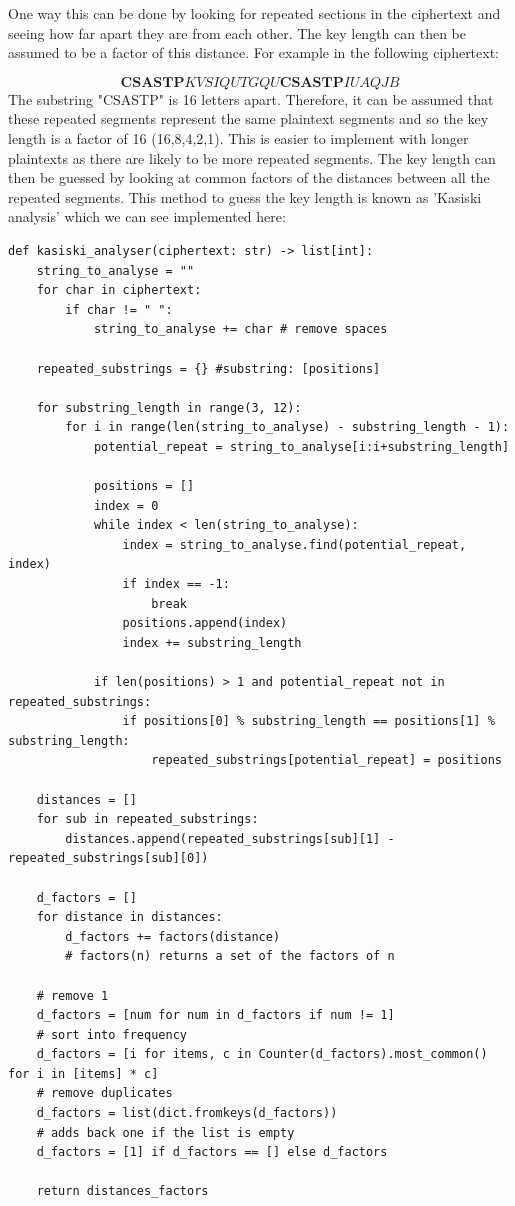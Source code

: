\documentclass{article}
\begin{document}
One way this can be done by looking for repeated sections in the ciphertext and seeing how far apart they are from each other. The key length can then be assumed to be a factor of this distance. For example in the following ciphertext:\medskip

\[\bm{CSASTP}KVSIQUTGQU\bm{CSASTP}IUAQJB\]
\medskip
The substring "CSASTP" is 16 letters apart. Therefore, it can be assumed that these repeated segments represent the same plaintext segments and so the key length is a factor of 16 (16,8,4,2,1). This is easier to implement with longer plaintexts as there are likely to be more repeated segments. The key length can then be guessed by looking at common factors of the distances between all the repeated segments. This method to guess the key length is known as 'Kasiski analysis' \cite{kasiski} which we can see implemented here:\medskip

\begin{lstlisting}
def kasiski_analyser(ciphertext: str) -> list[int]:
    string_to_analyse = ""
    for char in ciphertext:
        if char != " ":
            string_to_analyse += char # remove spaces

    repeated_substrings = {} #substring: [positions]

    for substring_length in range(3, 12):
        for i in range(len(string_to_analyse) - substring_length - 1):
            potential_repeat = string_to_analyse[i:i+substring_length]

            positions = []
            index = 0
            while index < len(string_to_analyse):
                index = string_to_analyse.find(potential_repeat, index)
                if index == -1:
                    break
                positions.append(index)
                index += substring_length

            if len(positions) > 1 and potential_repeat not in repeated_substrings:
                if positions[0] % substring_length == positions[1] % substring_length:
                    repeated_substrings[potential_repeat] = positions

    distances = []
    for sub in repeated_substrings:
        distances.append(repeated_substrings[sub][1] - repeated_substrings[sub][0])

    d_factors = []
    for distance in distances:
        d_factors += factors(distance)
        # factors(n) returns a set of the factors of n
 
    # remove 1
    d_factors = [num for num in d_factors if num != 1]
    # sort into frequency
    d_factors = [i for items, c in Counter(d_factors).most_common() for i in [items] * c]
    # remove duplicates
    d_factors = list(dict.fromkeys(d_factors))
    # adds back one if the list is empty
    d_factors = [1] if d_factors == [] else d_factors

    return distances_factors
\end{lstlisting}
\medskip
\end{document}
